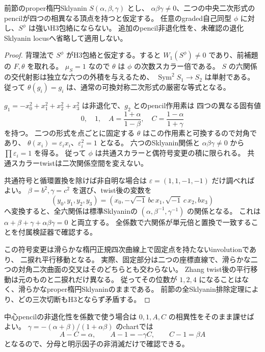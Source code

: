 \begin{theorem}
\label{thm:twisted-sklyanin-exclusion}
前節のproper楕円Sklyanin $S(\alpha,\beta,\gamma)$ とし、
$\alpha\beta\gamma\ne0$、二つの中央二次形式のpencilが四つの相異なる頂点を持つと仮定する。
任意のgraded自己同型 $\phi$ に対し、$S^\phi$ は強いH3包絡にならない。
追加のpencil非退化性を、未確認の退化Sklyanin locusへ省略して適用しない。
\end{theorem}
\begin{proof}
背理法で $S^\phi$ がH3包絡と仮定する。すると $W_1(S^\phi)\ne0$ であり、前補題の $F,\theta$ を取れる。
$\mu_S=1$ なので $\theta$ は $\phi$ の次数スカラー倍である。
$S$ の六関係の交代射影は独立な六つの外積を与えるため、
$\operatorname{Sym}^2S_1\to S_2$ は単射である。
従って $\theta(g_i)=g_i$ は、通常の可換対称二次形式の厳密な等式となる。

$g_1=-x_0^2+x_1^2+x_2^2+x_3^2$ は非退化で、$g_2$ とのpencil作用素は
四つの異なる固有値
\[
 0,\quad1,\quad A=\frac{1+\alpha}{1-\beta},\quad
 C=\frac{1-\alpha}{1+\gamma}
\]
を持つ。
二つの形式を点ごとに固定する $\theta$ はこの作用素と可換するので対角であり、
$\theta(x_i)=\varepsilon_i x_i$、$\varepsilon_i^2=1$ となる。
六つのSklyanin関係と $\alpha\beta\gamma\ne0$ から $\prod\varepsilon_i=1$ を得る。
従って $\phi$ は共通スカラーと偶符号変更の積に限られる。
共通スカラーtwistは二次関係空間を変えない。

共通符号と循環置換を除けば非自明な場合は
$\varepsilon=(1,1,-1,-1)$ だけ調べればよい。
$\beta=b^2,\gamma=c^2$ を選び、twist後の変数を
\[
 (y_0,y_1,y_2,y_3)=(x_0,-\sqrt{-1}\,bc\,x_1,
                         \sqrt{-1}\,c\,x_2,bx_3)
\]
へ変換すると、全六関係は標準Sklyaninの
$(\alpha,\beta^{-1},\gamma^{-1})$ の関係となる。
これは $\alpha+\beta+\gamma+\alpha\beta\gamma=0$ と両立する。
全係数で六関係が単元倍と置換で一致することを付属検証器で確認する。

この符号変更は滑らかな楕円正規四次曲線上で固定点を持たないinvolutionであり、
二捩れ平行移動となる。
実際、固定部分は二つの座標直線で、滑らかな二つの対角二次曲面の交叉はそのどちらとも交わらない。
Zhang twist後の平行移動は元のものと二捩れだけ異なる。
従ってその位数が $1,2,4$ になることはなく、滑らかなproper楕円Sklyaninのままである。
前節の全Sklyanin排除定理により、どの三次切断もH3とならず矛盾する。
\end{proof}

中心pencilの非退化性を係数で使う場合は $0,1,A,C$ の相異性をそのまま課せばよい。
$\gamma=-(\alpha+\beta)/(1+\alpha\beta)$ のchartでは
\[
 A-C=\alpha,\qquad A-1=-\gamma C,\qquad C-1=\beta A
\]
となるので、分母と明示因子の非消滅だけで確認できる。

